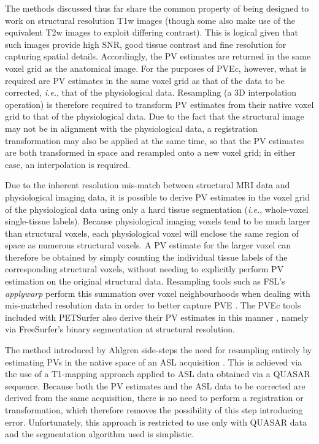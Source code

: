 The methods discussed thus far share the common property of being designed to work on structural resolution T1w images (though some also make use of the equivalent T2w images to exploit differing contrast). This is logical given that such images provide  high SNR, good tissue contrast and fine resolution for capturing spatial details. Accordingly, the PV estimates are returned in the same voxel grid as the anatomical image. For the purposes of PVEc, however, what is required are PV estimates in the same voxel grid as that of the data to be corrected, \textit{i.e.}, that of the physiological data. Resampling (a 3D interpolation operation) is therefore required to transform PV estimates from their native voxel grid to that of the physiological data. Due to the fact that the structural image may not be in alignment with the physiological data, a registration transformation may also be applied at the same time, so that the PV estimates are both transformed in space and resampled onto a new voxel grid; in either case, an interpolation is required. 

Due to the inherent resolution mis-match between structural MRI data and physiological imaging data, it is possible to derive PV estimates in the voxel grid of the physiological data using only a hard tissue segmentation (\textit{i.e.}, whole-voxel single-tissue labels). Because physiological imaging voxels tend to be much larger than structural voxels, each physiological voxel will enclose the same region of space as numerous structural voxels. A PV estimate for the larger voxel can therefore be obtained by simply counting the individual tissue labels of the corresponding structural voxels, without needing to explicitly perform PV estimation on the original structural data. Resampling tools such as FSL's \textit{applywarp} perform this summation over voxel neighbourhoods when dealing with mis-matched resolution data in order to better capture PVE \cite{Andersson2010}. The PVEc tools included with PETSurfer also derive their PV estimates in this manner \cite{Greve2016}, namely via FreeSurfer's binary segmentation at structural resolution.  

The method introduced by Ahlgren side-steps the need for resampling entirely by estimating PVs in the native space of an ASL acquisition \cite{Ahlgren2014}. This is achieved via the use of a T1-mapping approach applied to ASL data obtained via a QUASAR sequence. Because both the PV estimates and the ASL data to be corrected are derived from the same acquisition, there is no need to perform a registration or transformation, which therefore removes the possibility of this step introducing error. Unfortunately, this approach is restricted to use only with QUASAR data and the segmentation algorithm used is simplistic. 

